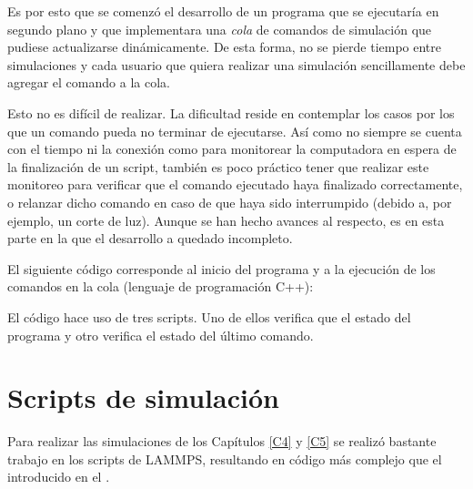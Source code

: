 Es por esto que se comenzó el desarrollo de un programa que se ejecutaría en segundo plano y que implementara una \textit{cola} de comandos de simulación que pudiese actualizarse dinámicamente. De esta forma, no se pierde tiempo entre simulaciones y cada usuario que quiera realizar una simulación sencillamente debe agregar el comando a la cola.

Esto no es difícil de realizar. La dificultad reside en contemplar los casos por los que un comando pueda no terminar de ejecutarse. Así como no siempre se cuenta con el tiempo ni la conexión como para monitorear la computadora en espera de la finalización de un script, también es poco práctico tener que realizar este monitoreo para verificar que el comando ejecutado haya finalizado correctamente, o relanzar dicho comando en caso de que haya sido interrumpido (debido a, por ejemplo, un corte de luz). Aunque se han hecho avances al respecto, es en esta parte en la que el desarrollo a quedado incompleto.

El siguiente código corresponde al inicio del programa y a la ejecución de los comandos en la cola (lenguaje de programación C++):



El código hace uso de tres scripts. Uno de ellos verifica que el estado del programa y otro verifica el estado del último comando.




\section{Scripts de simulación}

Para realizar las simulaciones de los Capítulos \ref{C4} y \ref{C5} se realizó bastante trabajo en los scripts de LAMMPS, resultando en código más complejo que el introducido en el .

